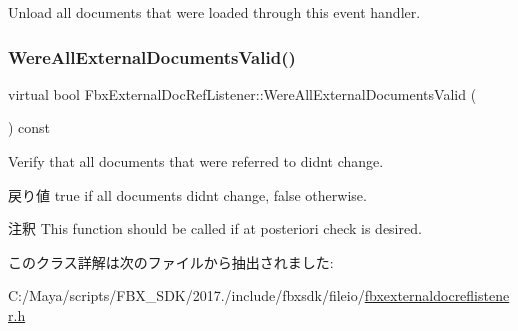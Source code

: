 Unload all documents that were loaded through this event handler. \mbox{\label{class_fbx_external_doc_ref_listener_a7a7e4947b7f4a250365a8761fb71cd1e}} 
\subsubsection{\texorpdfstring{Were\+All\+External\+Documents\+Valid()}{WereAllExternalDocumentsValid()}}
{\footnotesize\ttfamily virtual bool Fbx\+External\+Doc\+Ref\+Listener\+::\+Were\+All\+External\+Documents\+Valid (\begin{DoxyParamCaption}{ }\end{DoxyParamCaption}) const\hspace{0.3cm}{\ttfamily [virtual]}}

Verify that all documents that were referred to didn\textquotesingle{}t change. \begin{DoxyReturn}{戻り値}
{\ttfamily true} if all documents didn\textquotesingle{}t change, {\ttfamily false} otherwise. 
\end{DoxyReturn}
\begin{DoxyRemark}{注釈}
This function should be called if at posteriori check is desired. 
\end{DoxyRemark}


このクラス詳解は次のファイルから抽出されました\+:\begin{DoxyCompactItemize}
\item 
C\+:/\+Maya/scripts/\+F\+B\+X\+\_\+\+S\+D\+K/2017./include/fbxsdk/fileio/\hyperlink{fbxexternaldocreflistener_8h}{fbxexternaldocreflistener.\+h}\end{DoxyCompactItemize}
